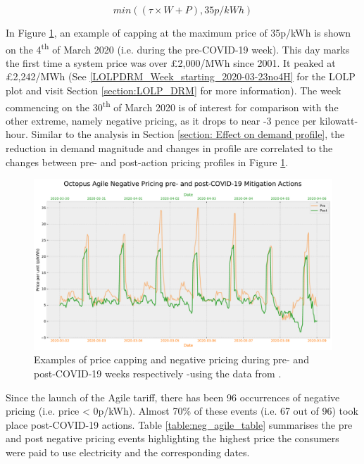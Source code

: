 \documentclass[energies,article,submit,moreauthors,pdftex]{Definitions/mdpi}
\begin{document}
\begin{equation}\label{eq:Octopus}
min((\tau \times W + P), 35p/kWh)
\end{equation}

In Figure \ref{fig:neg_agile}, an example of capping at the maximum price of 35p/kWh is shown on the 4\textsuperscript{th} of March 2020 (i.e. during the pre-COVID-19 week). This day marks the first time a system price was over £2,000/MWh since 2001. It peaked at £2,242/MWh \cite{ELEXONELEXONb} (See \ref{LOLPDRM_Week_starting_2020-03-23no4H} for the LOLP plot and visit Section \ref{section:LOLP_DRM} for more information). The week commencing on the 30\textsuperscript{th} of March 2020 is of interest for comparison with the other extreme, namely negative pricing, as it drops to near -3 pence per kilowatt-hour. Similar to the analysis in Section \ref{section: Effect on demand profile}, the reduction in demand magnitude and changes in profile are correlated to the changes between pre- and post-action pricing profiles in Figure \ref{fig:neg_agile}.

\begin{figure}[H]\centering
\hspace{-25pt}\includegraphics[trim={0 0 0 1.5cm}, clip,width=15 cm]{Graphics/Pre-post_Agilecomp_negative.pdf}
\caption{Examples of price capping and negative pricing during pre- and post-COVID-19 weeks respectively -using the data from \cite{HomeUK}.}\label{fig:neg_agile}
\end{figure}  




Since the launch of the Agile tariff, there has been 96 occurrences of negative pricing (i.e. price < 0p/kWh). Almost 70\% of these events (i.e. 67 out of 96) took place post-COVID-19 actions. Table \ref{table:neg_agile_table} summarises the pre and post negative pricing events highlighting the highest price the consumers were paid to use electricity and the corresponding dates.
\end{document}
